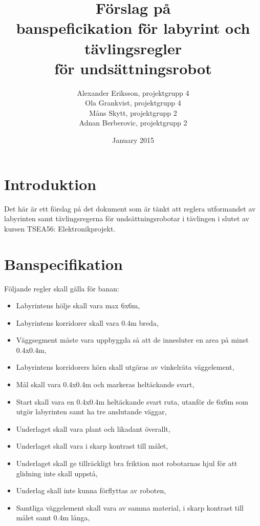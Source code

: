 \documentclass{article}
\title{Förslag på \\banspeficikation för labyrint och tävlingsregler\\ för undsättningsrobot}
\author{Alexander Eriksson, projektgrupp 4
\\  Ola Grankvist, projektgrupp 4
\\ Måns Skytt, projektgrupp 2
\\ Adnan Berberovic, projektgrupp 2}
\date{January 2015}
\begin{document}
\maketitle

\section{Introduktion}
Det här är ett förslag på det dokument som är tänkt att reglera utformandet av labyrinten samt tävlingsregerna för undsättningsrobotar i tävlingen i slutet av kursen TSEA56: Elektronikprojekt. 

\section{Banspecifikation}
Följande regler skall gälla för banan:
\begin{itemize}
\item Labyrintens hölje skall vara max 6x6m,
\item Labyrintens korridorer skall vara 0.4m breda, 
\item Väggsegment måste vara uppbyggda så att de innesluter en area på minst 0.4x0.4m,
\item Labyrintens korridorers hörn skall utgöras av vinkelräta väggelement, 
\item Mål skall vara 0.4x0.4m och markeras heltäckande svart,
\item Start skall vara en 0.4x0.4m heltäckande svart ruta, utanför de 6x6m som utgör labyrinten samt ha tre anslutande väggar,
\item Underlaget skall vara plant och likadant överallt,
\item Underlaget skall vara i skarp kontrast till målet,
\item Underlaget skall ge tillräckligt bra friktion mot robotarnas hjul för att glidning inte skall uppstå, 
\item Underlag skall inte kunna förflyttas av roboten, 
\item Samtliga väggelement skall vara av samma material, i skarp kontrast till målet samt 0.4m långa, 
\end{itemize}
\end{document}
